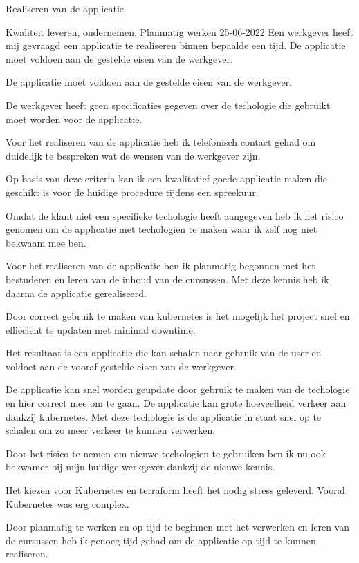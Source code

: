 {%
	\bewijs
	{%
		Realiseren van de applicatie.
	}
	{%
		\starr
		{%
			Kwaliteit leveren,
			ondernemen,
			Planmatig werken
		}
		{%
			25-06-2022
		}
		{%
			Een werkgever heeft mij gevraagd een applicatie te realiseren binnen bepaalde een tijd.
			De applicatie moet voldoen aan de gestelde eisen van de werkgever.
		}
		{%
			De applicatie moet voldoen aan de gestelde eisen van de werkgever.

			De werkgever heeft geen specificaties gegeven over de techologie die gebruikt moet worden voor de applicatie.

		}
		{%
			Voor het realiseren van de applicatie heb ik telefonisch contact gehad om duidelijk te bespreken wat de wensen van de werkgever zijn.

			Op basis van deze criteria kan ik een kwalitatief goede applicatie maken die geschikt is voor de huidige procedure tijdens een spreekuur.

			Omdat de klant niet een specifieke techologie heeft aangegeven heb ik het risico genomen om de applicatie met techologien te maken waar ik zelf nog niet bekwaam mee ben.

			Voor het realiseren van de applicatie ben ik planmatig begonnen met het bestuderen en leren van de inhoud van de cursussen.
			Met deze kennis heb ik daarna de applicatie gerealiseerd.

			Door correct gebruik te maken van kubernetes is het mogelijk het project snel en effiecient te updaten met minimal downtime.

		}
		{%
			Het resultaat is een applicatie die kan schalen naar gebruik van de user en voldoet aan de vooraf gestelde eisen van de werkgever.

			De applicatie kan snel worden geupdate door gebruik te maken van de techologie en hier correct mee om te gaan.
			De applicatie kan grote hoeveelheid verkeer aan dankzij kubernetes.
			Met deze techologie is de applicatie in staat snel op te schalen om zo meer verkeer te kunnen verwerken.

			Door het risico te nemen om nieuwe techologien te gebruiken ben ik nu ook bekwamer bij mijn huidige werkgever dankzij de nieuwe kennis.
		}
		{%

			Het kiezen voor Kubernetes en terraform heeft het nodig stress geleverd.
			Vooral Kubernetes was erg complex.

			Door planmatig te werken en op tijd te beginnen met het verwerken en leren van de cursussen heb ik genoeg tijd gehad om de applicatie op tijd te kunnen realiseren.

}}}
